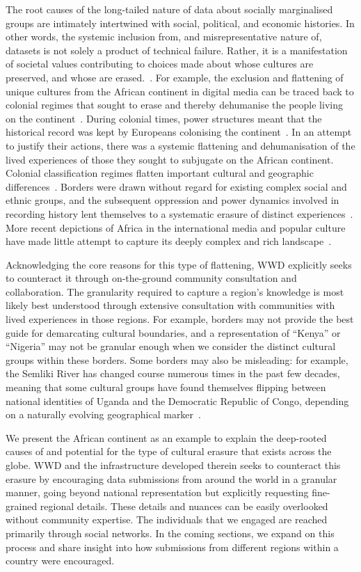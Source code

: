 The root causes of the long-tailed nature of data about socially marginalised groups are intimately intertwined with social, political, and economic histories. In other words, the systemic inclusion from, and misrepresentative nature of, datasets is not solely a product of technical failure. Rather, it is a manifestation of societal values contributing to choices made about whose cultures are preserved, and whose are erased.~\cite{bowker2000sorting,cheney2017we,brubaker2011select,benthall2019racial,benjamin2019race}. For example, the exclusion and flattening of unique cultures from the African continent in digital media can be traced back to colonial regimes that sought to erase and thereby dehumanise the people living on the continent~\cite{faloyin_africa_2022}. During colonial times, power structures meant that the historical record was kept by Europeans colonising the continent~\cite{bowker2000sorting}. In an attempt to justify their actions, there was a systemic flattening and dehumanisation of the lived experiences of those they sought to subjugate on the African continent. Colonial classification regimes flatten important cultural and geographic differences~\cite{das2022,prabhakaran2022cultural,das2021}. Borders were drawn without regard for existing complex social and ethnic groups, and the subsequent oppression and power dynamics involved in recording history lent themselves to a systematic erasure of distinct experiences~\cite{bowker2000sorting}. More recent depictions of Africa in the international media and popular culture have made little attempt to capture its deeply complex and rich landscape~\cite{faloyin_africa_2022}.   

Acknowledging the core reasons for this type of flattening, \textsc{WWD} explicitly seeks to counteract it through on-the-ground community consultation and collaboration. The granularity required to capture a region's knowledge is most likely best understood through extensive consultation with communities with lived experiences in those regions. For example, borders may not provide the best guide for demarcating cultural boundaries, and a representation of “Kenya” or “Nigeria” may not be granular enough when we consider the distinct cultural groups within these borders. Some borders may also be misleading: for example, the Semliki River has changed course numerous times in the past few decades, meaning that some cultural groups have found themselves flipping between national identities of Uganda and the Democratic Republic of Congo, depending on a naturally evolving geographical marker~\cite{faloyin_africa_2022}.


We present the African continent as an example to explain the deep-rooted causes of and potential for the type of cultural erasure that exists across the globe. \textsc{WWD} and the infrastructure developed therein seeks to counteract this erasure by encouraging data submissions from around the world in a granular manner, going beyond national representation but explicitly requesting fine-grained regional details. These details and nuances can be easily overlooked without community expertise. The individuals that we engaged are reached primarily through social networks. In the coming sections, we expand on this process and share insight into how submissions from different regions within a country were encouraged.